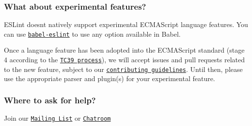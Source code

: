 \subsubsection*{What about experimental features?}

E\+S\+Lint doesn\textquotesingle{}t natively support experimental E\+C\+M\+A\+Script language features. You can use \href{https://github.com/babel/babel-eslint}{\tt babel-\/eslint} to use any option available in Babel.

Once a language feature has been adopted into the E\+C\+M\+A\+Script standard (stage 4 according to the \href{https://tc39.github.io/process-document/}{\tt T\+C39 process}), we will accept issues and pull requests related to the new feature, subject to our \href{http://eslint.org/docs/developer-guide/contributing}{\tt contributing guidelines}. Until then, please use the appropriate parser and plugin(s) for your experimental feature.

\subsubsection*{Where to ask for help?}

Join our \href{https://groups.google.com/group/eslint}{\tt Mailing List} or \href{https://gitter.im/eslint/eslint}{\tt Chatroom} 